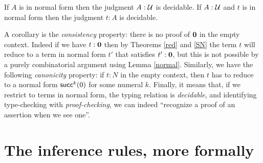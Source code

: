 \begin{thm}
If $A$ is in normal form then the 
judgment $A : \mathcal{U}$ is decidable. If $A : \mathcal{U}$ and $t$ is in normal form then the judgment
$t:A$ is decidable.
\end{thm}


 A corollary is the {\em consistency} property: there is no proof of $\mathbf{0}$ in the empty
context. Indeed if we have $t:\mathbf{0}$ then by Theorems \ref{red} and \ref{SN} the term $t$ will reduce
to a term in normal form $t'$ that satisfies $t':\mathbf{0}$, but this is not possible by a 
purely combinatorial argument using Lemma \ref{normal}. Similarly, we have the following
{\em canonicity} property: if $t:N$ in the empty context, then $t$ has to reduce to a
normal form $\mathsf{succ}^k(0)$ for some numeral $k$. Finally, it means that, if we restrict to terms
in normal form, the typing relation is {\em decidable}, and identifying type-checking with
{\em proof-checking}, we can indeed ``recognize a proof of an assertion when we see one''.

\egroup

\section{The inference rules, more formally}\label{syntax-more-formally}

\bgroup %

\newcommand{\oftype}{\mathord{:}}
\newcommand{\types}{\vdash}
\newcommand{\myType}{\textsf{ type}} %

\newcommand{\synId}{\mathsf{Id}} %
\newcommand{\synOne}{\mathsf{1}}
\newcommand{\synZero}{\mathsf{0}}
\newcommand{\synPlus}{+}

\newcommand{\synrefl}{\mathsf{refl}}
\newcommand{\synlambda}{\mathsf{\lambda}}
\newcommand{\myRefl}{\mathsf{refl}} %
\newcommand{\synsup}{\mathsf{sup}}
\newcommand{\synz}{\mathsf{z}}
\newcommand{\syno}{\mathsf{o}}
\newcommand{\synw}{\mathsf{w}}

\renewcommand{\G}{\Gamma}
\newcommand{\ctx}{\ensuremath{\mathsf{ctx}}}
\newcommand{\emptyctx}{\cdot}
\newcommand{\wfctx}[1]{\vdash #1\ \ctx}
\newcommand{\oftp}[3]{#1 \vdash #2 : #3}
\newcommand{\jdeqtp}[4]{#1 \vdash #2 \jdeq #3 : #4}
\newcommand{\tmtp}[2]{#1 \mathord{:} #2}
\newcommand{\form}{\textsc{form}}
\newcommand{\intro}{\textsc{intro}}
\newcommand{\elim}{\textsc{elim}}
\newcommand{\comp}{\textsc{comp}}
\newcommand{\Weak}{\mathsf{Wkg}}
\newcommand{\Vble}{\mathsf{Vble}}
\newcommand{\Exch}{\mathsf{Exch}}
\newcommand{\Subst}{\mathsf{Subst}}

